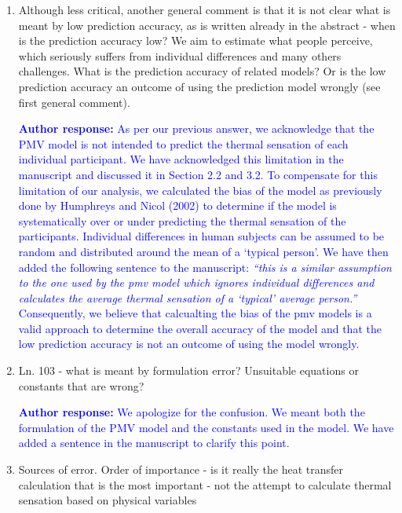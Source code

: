 \documentclass[a4paper, 10pt]{letter}
\newcommand{\response}[1]{\textcolor{blue}{\textbf{Author response:} #1}}
\begin{document}
\begin{letter}
\begin{enumerate}
            \item Although less critical, another general comment is that it is not clear what is meant by low prediction accuracy, as is written already in the abstract - when is the prediction accuracy low?
            We aim to estimate what people perceive, which seriously suffers from individual differences and many others challenges.
            What is the prediction accuracy of related models?
            Or is the low prediction accuracy an outcome of using the prediction model wrongly (see first general comment).

            \response{
                As per our previous answer, we acknowledge that the PMV model is not intended to predict the thermal sensation of each individual participant.
                We have acknowledged this limitation in the manuscript and discussed it in Section 2.2 and 3.2.
                To compensate for this limitation of our analysis, we calculated the bias of the model as previously done by Humphreys and Nicol (2002) to determine if the model is systematically over or under predicting the thermal sensation of the participants.
                Individual differences in human subjects can be assumed to be random and distributed around the mean of a `typical person'.
                We have then added the following sentence to the manuscript: \textit{``this is a similar assumption to the one used by the \ac{pmv} model which ignores individual differences and calculates the average thermal sensation of a `typical' average person.''}
                Consequently, we believe that calcualting the bias of the \ac{pmv} models is a valid approach to determine the overall accuracy of the model and that the low prediction accuracy is not an outcome of using the model wrongly.
            }

            \item Ln. 103 - what is meant by formulation error?
            Unsuitable equations or constants that are wrong?

            \response{
                We apologize for the confusion.
                We meant both the formulation of the PMV model and the constants used in the model.
                We have added a sentence in the manuscript to clarify this point.
            }

            \item Sources of error.
            Order of importance - is it really the heat transfer calculation that is the most important - not the attempt to calculate thermal sensation based on physical variables


\end{enumerate}
\end{letter}
\end{document}
